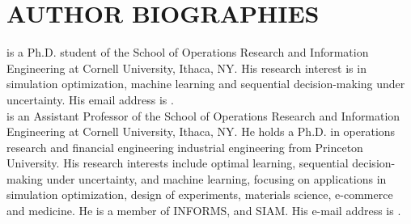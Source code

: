 \documentclass{wscpaperproc}
\theoremstyle{wsc}
\begin{document}



\section*{AUTHOR BIOGRAPHIES}

 is a Ph.D. student of the School of Operations Research and Information Engineering at Cornell University, Ithaca, NY. His research interest is in simulation optimization, machine learning and sequential decision-making under uncertainty. His email address is . \\

 is an Assistant Professor of the School of Operations Research and Information Engineering at Cornell University, Ithaca, NY.  He holds a Ph.D. in operations research and financial engineering industrial engineering from Princeton University. His research interests include optimal learning, sequential decision-making under uncertainty, and machine learning, focusing on applications in simulation optimization, design of experiments, materials science, e-commerce and medicine. He is a member of INFORMS, and SIAM. His e-mail address is .\\
\end{document}

